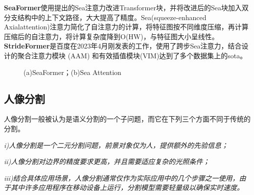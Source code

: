 \documentclass[11pt]{article}
\begin{document}
\textbf{SeaFormer}\cite{sea}使用提出的Sea注意力改进Transformer块，并将改进后的Sea块加入双分支结构中的上下文路径，大大提高了精度。Sea(squeeze-enhanced Axialattention)注意力简化了自注意力的计算，将特征图按不同维度压缩，再计算压缩后的自注意力，将计算复杂度降到O(HW)，与特征图大小呈线性。
\textbf{StrideFormer}\cite{ppl}是百度在2023年4月刚发表的工作，使用了跨步Sea注意力，结合设计的聚合注意力模块 (AAM) 和有效插值模块(VIM)达到了多个数据集上的sota。
\begin{figure}[!h]
    \centering
    
    \centering
    \caption{(a)SeaFormer\cite{sea}；(b)Sea Attention}
\end{figure}
\subsection{人像分割}
人像分割一般被认为是语义分割的一个子问题，而它在下列三个方面不同于传统的分割。

\textit{i)人像分割是一个二元分割问题，前景对象仅为人，提供额外的先验信息；}

\textit{ii)人像分割对边界的精度要求更高，并且需要适应复杂的光照条件；}

\textit{iii)结合具体应用场景，人像分割通常仅作为实际应用中的几个步骤之一使用，由于其中许多应用程序在移动设备上运行，分割模型需要轻量级以确保实时速度。}
\end{document}
